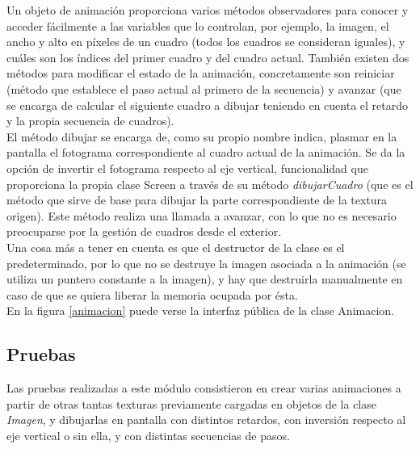Un objeto de animación proporciona varios métodos observadores para conocer y acceder fácilmente a las variables que lo controlan, por ejemplo, la imagen, el ancho y alto en píxeles de un cuadro (todos los cuadros se consideran iguales), y cuáles son los índices del primer cuadro y del cuadro actual. También existen dos métodos para modificar el estado de la animación, concretamente son reiniciar (método que establece el paso actual al primero de la secuencia) y avanzar (que se encarga de calcular el siguiente cuadro a dibujar teniendo en cuenta el retardo y la propia secuencia de cuadros).\\

El método dibujar se encarga de, como su propio nombre indica, plasmar en la pantalla el fotograma correspondiente al cuadro actual de la animación. Se da la opción de invertir el fotograma respecto al eje vertical, funcionalidad que proporciona la propia clase Screen a través de su método \emph{dibujarCuadro} (que es el método que sirve de base para dibujar la parte correspondiente de la textura origen). Este método realiza una llamada a avanzar, con lo que no es necesario preocuparse por la gestión de cuadros desde el exterior.\\

Una cosa más a tener en cuenta es que el destructor de la clase es el predeterminado, por lo que no se destruye la imagen asociada a la animación (se utiliza un puntero constante a la imagen), y hay que destruirla manualmente en caso de que se quiera liberar la memoria ocupada por ésta.\\

En la figura \ref{animacion} puede verse la interfaz pública de la clase Animacion.\\


\subsection{Pruebas}

Las pruebas realizadas a este módulo consistieron en crear varias animaciones a partir de otras tantas texturas previamente cargadas en objetos de la clase \emph{Imagen}, y dibujarlas en pantalla con distintos retardos, con inversión respecto al eje vertical o sin ella, y con distintas secuencias de pasos.

